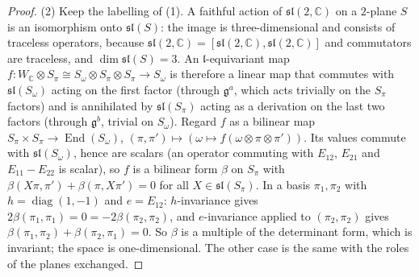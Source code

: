 \documentclass[11pt]{article}
\theoremstyle{definition}
\newcommand{\C}{\mathbb{C}}
\newcommand{\End}{\operatorname{End}}
\newcommand{\Som}{S_\omega}
\newcommand{\Spi}{S_\pi}
\begin{document}
\begin{proof}
(2) Keep the labelling of (1). A faithful action of $\mathfrak{sl}(2,\C)$ on a $2$-plane $S$ is an isomorphism onto $\mathfrak{sl}(S)$: the image is three-dimensional and consists of traceless operators, because $\mathfrak{sl}(2,\C) = [\mathfrak{sl}(2,\C), \mathfrak{sl}(2,\C)]$ and commutators are traceless, and $\dim\mathfrak{sl}(S) = 3$. An $\mathfrak{l}$-equivariant map $f: W_\C\otimes\Spi \cong \Som\otimes\Spi\otimes\Spi \to \Som$ is therefore a linear map that commutes with $\mathfrak{sl}(\Som)$ acting on the first factor (through $\mathfrak{g}^a$, which acts trivially on the $\Spi$ factors) and is annihilated by $\mathfrak{sl}(\Spi)$ acting as a derivation on the last two factors (through $\mathfrak{g}^b$, trivial on $\Som$). Regard $f$ as a bilinear map $\Spi\times\Spi \to \End(\Som)$, $(\pi,\pi') \mapsto (\omega \mapsto f(\omega\otimes\pi\otimes\pi'))$. Its values commute with $\mathfrak{sl}(\Som)$, hence are scalars (an operator commuting with $E_{12}$, $E_{21}$ and $E_{11} - E_{22}$ is scalar), so $f$ is a bilinear form $\beta$ on $\Spi$ with $\beta(X\pi, \pi') + \beta(\pi, X\pi') = 0$ for all $X \in \mathfrak{sl}(\Spi)$. In a basis $\pi_1, \pi_2$ with $h = \operatorname{diag}(1,-1)$ and $e = E_{12}$: $h$-invariance gives $2\beta(\pi_1,\pi_1) = 0 = -2\beta(\pi_2,\pi_2)$, and $e$-invariance applied to $(\pi_2, \pi_2)$ gives $\beta(\pi_1,\pi_2) + \beta(\pi_2,\pi_1) = 0$. So $\beta$ is a multiple of the determinant form, which is invariant; the space is one-dimensional. The other case is the same with the roles of the planes exchanged.
\end{proof}
\end{document}
